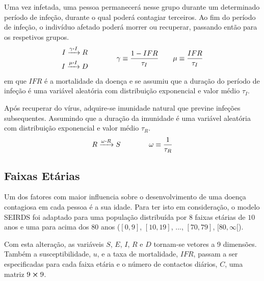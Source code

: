 Uma vez infetada, uma pessoa permanecerá nesse grupo durante um determinado período de infeção, durante o qual poderá contagiar terceiros.
Ao fim do período de infeção, o indivíduo afetado poderá morrer ou recuperar, passando então para os respetivos grupos.
\begin{equation*}
        \begin{gathered}
            I \xrightarrow{\gamma\vdot I} R \\
            I \xrightarrow{\mu\vdot I} D \\
        \end{gathered}
        \qquad\qquad
        \gamma \equiv \frac{1-IFR}{\tau_I}
        \qquad
        \mu \equiv \frac{IFR}{\tau_I}
\end{equation*}
em que $IFR$ é a mortalidade da doença e se assumiu que a duração do período de infeção é uma variável aleatória com distribuição exponencial e valor médio $\tau_I$.

Após recuperar do vírus, adquire-se imunidade natural que previne infeções subsequentes.
Assumindo que a duração da imunidade é uma variável aleatória com distribuição exponencial e valor médio $\tau_R$.
\begin{equation*}
        R \xrightarrow{\omega\vdot R} S
        \qquad\qquad
        \omega \equiv \frac{1}{\tau_R}
\end{equation*}

\subsection{Faixas Etárias}
Um dos fatores com maior influencia sobre o desenvolvimento de uma doença contagiosa em cada pessoa é a sua idade.
Para ter isto em consideração, o modelo SEIRDS foi adaptado para uma população distribuída por 8 faixas etárias de $10$ anos e uma para acima dos $80$ anos ($[0,9]$, $[10,19]$, ..., $[70,79]$, $[80,\infty[$).

Com esta alteração, as variáveis $S$, $E$, $I$, $R$ e $D$ tornam-se vetores a 9 dimensões.
Também a susceptibilidade, $u$, e a taxa de mortalidade, $IFR$, passam a ser especificadas para cada faixa etária e o número de contactos diários, $C$, uma matriz $9\cp9$.


